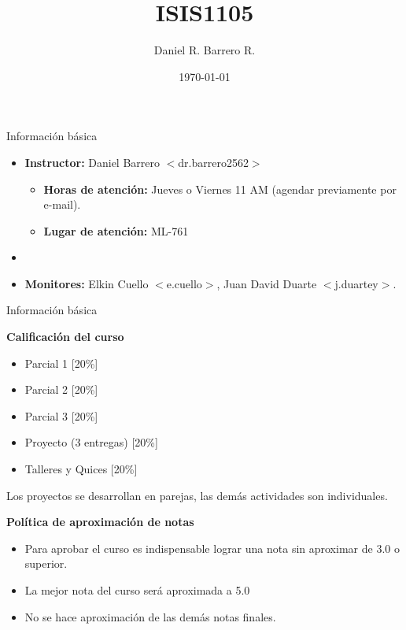 \documentclass{beamer}
\title{ISIS1105}
\author{Daniel R. Barrero R.}
\institute{Universidad de los Andes}
\date{\today}
\begin{document}
\frame{\titlepage}

%

\begin{frame}{Información básica}

\begin{itemize}
    \item \textbf{Instructor:} Daniel Barrero $<$dr.barrero2562$>$ \pause
    \begin{itemize}
        \item \textbf{Horas de atención:} Jueves o Viernes 11 AM (agendar previamente por e-mail).
        \item \textbf{Lugar de atención:} ML-761
    \end{itemize}
    \item[ ]\pause
    \item \textbf{Monitores:} Elkin Cuello $<$e.cuello$>$, Juan David Duarte $<$j.duartey$>$.
\end{itemize}
    
\end{frame}

%

\begin{frame}{Información básica}

\textbf{Calificación del curso} \pause

\begin{itemize}
    \item Parcial 1 [20\%]
    \item Parcial 2 [20\%]
    \item Parcial 3 [20\%] \pause
    \item Proyecto (3 entregas) [20\%] \pause
    \item Talleres y Quices [20\%] \pause
\end{itemize}

Los proyectos se desarrollan en parejas, las demás actividades son individuales. \\

\bigskip

\textbf{Política de aproximación de notas} \pause

\begin{itemize}
    \item Para aprobar el curso es indispensable lograr una nota sin aproximar de 3.0 o superior. \pause
    \item La mejor nota del curso será aproximada a 5.0 \pause
    \item No se hace aproximación de las demás notas finales. \pause
\end{itemize}
    
\end{frame}
\end{document}
